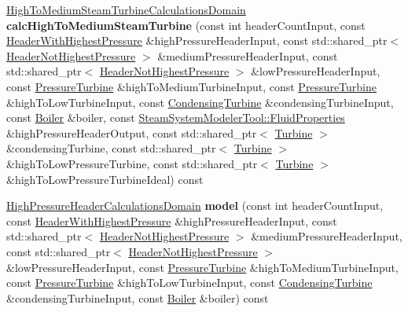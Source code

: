 \begin{DoxyCompactItemize}
\mbox{\label{class_high_pressure_header_modeler_a6a24f4385ad44c16b27bb99ab17372e1}} 
\hyperlink{class_high_to_medium_steam_turbine_calculations_domain}{High\+To\+Medium\+Steam\+Turbine\+Calculations\+Domain} {\bfseries calc\+High\+To\+Medium\+Steam\+Turbine} (const int header\+Count\+Input, const \hyperlink{class_header_with_highest_pressure}{Header\+With\+Highest\+Pressure} \&high\+Pressure\+Header\+Input, const std\+::shared\+\_\+ptr$<$ \hyperlink{class_header_not_highest_pressure}{Header\+Not\+Highest\+Pressure} $>$ \&medium\+Pressure\+Header\+Input, const std\+::shared\+\_\+ptr$<$ \hyperlink{class_header_not_highest_pressure}{Header\+Not\+Highest\+Pressure} $>$ \&low\+Pressure\+Header\+Input, const \hyperlink{class_pressure_turbine}{Pressure\+Turbine} \&high\+To\+Medium\+Turbine\+Input, const \hyperlink{class_pressure_turbine}{Pressure\+Turbine} \&high\+To\+Low\+Turbine\+Input, const \hyperlink{class_condensing_turbine}{Condensing\+Turbine} \&condensing\+Turbine\+Input, const \hyperlink{class_boiler}{Boiler} \&boiler, const \hyperlink{struct_steam_system_modeler_tool_1_1_fluid_properties}{Steam\+System\+Modeler\+Tool\+::\+Fluid\+Properties} \&high\+Pressure\+Header\+Output, const std\+::shared\+\_\+ptr$<$ \hyperlink{class_turbine}{Turbine} $>$ \&condensing\+Turbine, const std\+::shared\+\_\+ptr$<$ \hyperlink{class_turbine}{Turbine} $>$ \&high\+To\+Low\+Pressure\+Turbine, const std\+::shared\+\_\+ptr$<$ \hyperlink{class_turbine}{Turbine} $>$ \&high\+To\+Low\+Pressure\+Turbine\+Ideal) const
\item 
\mbox{\label{class_high_pressure_header_modeler_a2ada0d9d67ef16c0256f5ee52358167d}} 
\hyperlink{class_high_pressure_header_calculations_domain}{High\+Pressure\+Header\+Calculations\+Domain} {\bfseries model} (const int header\+Count\+Input, const \hyperlink{class_header_with_highest_pressure}{Header\+With\+Highest\+Pressure} \&high\+Pressure\+Header\+Input, const std\+::shared\+\_\+ptr$<$ \hyperlink{class_header_not_highest_pressure}{Header\+Not\+Highest\+Pressure} $>$ \&medium\+Pressure\+Header\+Input, const std\+::shared\+\_\+ptr$<$ \hyperlink{class_header_not_highest_pressure}{Header\+Not\+Highest\+Pressure} $>$ \&low\+Pressure\+Header\+Input, const \hyperlink{class_pressure_turbine}{Pressure\+Turbine} \&high\+To\+Medium\+Turbine\+Input, const \hyperlink{class_pressure_turbine}{Pressure\+Turbine} \&high\+To\+Low\+Turbine\+Input, const \hyperlink{class_condensing_turbine}{Condensing\+Turbine} \&condensing\+Turbine\+Input, const \hyperlink{class_boiler}{Boiler} \&boiler) const

\end{DoxyCompactItemize}
